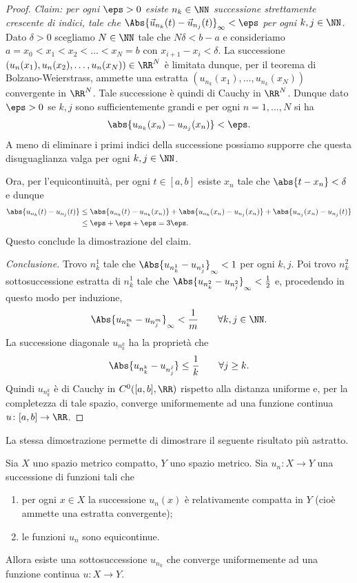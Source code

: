 \begin{proof}
\emph{Claim: per ogni $\eps>0$ esiste $n_k\in \NN$ successione strettamente 
crescente di indici, 
tale che $\Abs{\vec u_{n_k}(t) - \vec u_{n_j}(t)}_\infty < \eps$ per ogni $k,j\in \NN$.}
Dato $\delta>0$ scegliamo $N\in \NN$ tale che $N \delta < b-a$ e 
consideriamo $a=x_0 < x_1 < x_2 < \dots < x_N=b$ con $x_{i+1}-x_i < \delta$.
La successione $(u_n(x_1), u_n(x_2), \dots, u_n(x_N))\in \RR^N$ 
è limitata dunque, per il teorema di Bolzano-Weierstrass,
ammette una estratta $(u_{n_k}(x_1),\dots,u_{n_k}(x_N))$ convergente in $\RR^N$.
Tale successione è quindi di Cauchy in $\RR^N$. 
Dunque 
dato $\eps>0$ se $k,j$ sono sufficientemente grandi e per ogni $n=1,\dots,N$ si ha
\[
  \abs{u_{n_k}(x_n) - u_{n_j}(x_n)} < \eps.
\]
A meno di eliminare i primi indici della successione possiamo supporre che
questa disuguaglianza valga per ogni $k,j\in \NN$.

Ora, per l'equicontinuità, per ogni $t\in [a,b]$ esiste $x_n$ tale che
$\abs{t - x_n} < \delta$ e dunque
\begin{align*}
  \abs{u_{n_k}(t) - u_{n_j}(t)} 
  &\le \abs{u_{n_k}(t) - u_{n_k}(x_n)} + \abs{u_{n_k}(x_n) - u_{n_j}(x_n)} + \abs{u_{n_j}(x_n) - u_{n_j}(t)} \\
  &\le \eps + \eps + \eps = 3 \eps.
\end{align*}
Questo conclude la dimostrazione del claim.

\emph{Conclusione.}
Trovo $n_k^1$ tale che $\Abs{u_{n_k^1} - u_{n_j^1}}_\infty < 1$ per ogni $k,j$.
Poi trovo $n_k^2$ sottosuccessione estratta di $n_k^1$ tale che
$\Abs{u_{n_k^2} - u_{n_j^2}}_\infty < \frac 1 2$ e, 
procedendo in questo modo per induzione,
\[
  \Abs{u_{n_k^m} - u_{n_j^m}}_\infty < \frac 1 m \qquad \forall k,j \in \NN.
\]
La successione diagonale $u_{n_k^k}$ ha la proprietà che
\[
  \Abs{u_{n_k^k} - u_{n_j^j}} \le \frac 1 k \qquad \forall j\ge k.
\]
Quindi $u_{n_k^k}$ è di Cauchy in $C^0([a,b],\RR)$ rispetto alla distanza 
uniforme e, per la completezza di tale spazio, converge uniformemente 
ad una funzione continua $u \colon [a,b] \to \RR$.
\end{proof}

La stessa dimostrazione permette di dimostrare il seguente risultato 
più astratto.

\begin{theorem}
Sia $X$ uno spazio metrico compatto, $Y$ uno spazio metrico. 
Sia $u_n\colon X \to Y$ una successione di funzioni tali che 
\begin{enumerate}
    \item per ogni $x\in X$ la successione $u_n(x)$ è relativamente compatta 
    in $Y$ (cioè ammette una estratta convergente);
    \item le funzioni $u_n$ sono equicontinue.
\end{enumerate}
Allora esiste una sottosuccessione $u_{n_k}$ che converge uniformemente
ad una funzione continua $u\colon X \to Y$.
\end{theorem}

